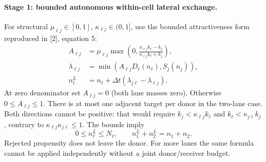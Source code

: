 \documentclass[10pt,a4paper]{article}
\begin{document}
\paragraph{Stage 1: bounded autonomous within-cell lateral exchange.}
For structural $\mu_{\ell j}\in[0,1]$, $\kappa_{\ell j}\in(0,1]$, use the
bounded attractiveness form reproduced in [2], equation 5:
\begin{align}
 A_{\ell j}&=\mu_{\ell j}\max\left(0,
 \frac{\kappa_{\ell j}k_\ell-k_j}{\kappa_{\ell j}k_\ell+k_j}\right),\\
 \lambda_{\ell j}&=\min(A_{\ell j}D_\ell(n_\ell),S_j(n_j)),\\
 n_\ell^L&=n_\ell+\Delta t(\lambda_{j\ell}-\lambda_{\ell j}).
\end{align}
At zero denominator set $A_{\ell j}=0$ (both lane masses zero). Otherwise
$0\leq A_{\ell j}\leq1$. There is at most one adjacent target per donor in
the two-lane case. Both directions cannot be positive: that would require
$k_j<\kappa_{\ell j}k_\ell$ and $k_\ell<\kappa_{j\ell}k_j$, contrary to
$\kappa_{\ell j}\kappa_{j\ell}\leq1$. The bounds imply
\begin{equation}
 0\leq n_\ell^L\leq N_\ell,\qquad
 n_1^L+n_2^L=n_1+n_2.
\end{equation}
Rejected propensity does not leave the donor. For more lanes the same formula
cannot be applied independently without a joint donor/receiver budget.
\end{document}
